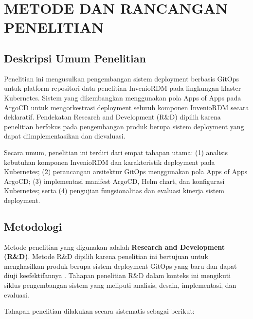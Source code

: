 \chapter{METODE DAN RANCANGAN PENELITIAN}

\section{Deskripsi Umum Penelitian}

Penelitian ini mengusulkan pengembangan sistem deployment berbasis GitOps untuk platform repositori data penelitian InvenioRDM pada lingkungan klaster Kubernetes. Sistem yang dikembangkan menggunakan pola Apps of Apps pada ArgoCD untuk mengorkestrasi deployment seluruh komponen InvenioRDM secara deklaratif. Pendekatan Research and Development (R\&D) dipilih karena penelitian berfokus pada pengembangan produk berupa sistem deployment yang dapat diimplementasikan dan dievaluasi.

Secara umum, penelitian ini terdiri dari empat tahapan utama: (1) analisis kebutuhan komponen InvenioRDM dan karakteristik deployment pada Kubernetes; (2) perancangan arsitektur GitOps menggunakan pola Apps of Apps ArgoCD; (3) implementasi manifest ArgoCD, Helm chart, dan konfigurasi Kubernetes; serta (4) pengujian fungsionalitas dan evaluasi kinerja sistem deployment.

\section{Metodologi}

Metode penelitian yang digunakan adalah \textbf{Research and Development (R\&D)}. Metode R\&D dipilih karena penelitian ini bertujuan untuk menghasilkan produk berupa sistem deployment GitOps yang baru dan dapat diuji keefektifannya \citep{limoncelli2018}. Tahapan penelitian R\&D dalam konteks ini mengikuti siklus pengembangan sistem yang meliputi analisis, desain, implementasi, dan evaluasi.

Tahapan penelitian dilakukan secara sistematis sebagai berikut:

